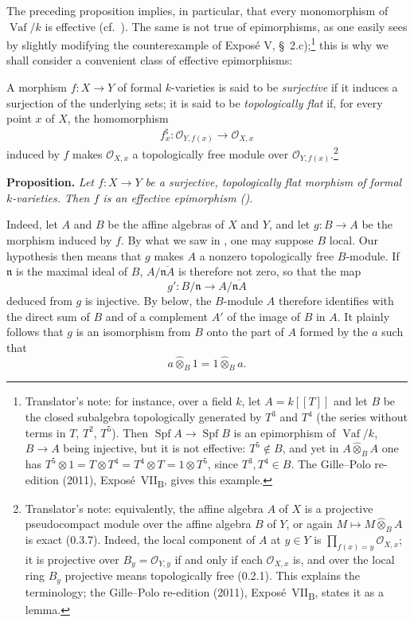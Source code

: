 The preceding proposition implies, in particular, that every
monomorphism of \(\operatorname{Vaf}/k\) is effective
\textup{(cf.\ )}.
The same is not true of epimorphisms, as one easily sees by slightly
modifying the counterexample of Expos\'e V, \S~2.c);\footnote{Translator's note: for instance, over a field
\(k\), let \(A=k[[T]]\) and let \(B\) be the closed subalgebra topologically generated by \(T^3\) and
\(T^4\) (the series without terms in \(T\), \(T^2\), \(T^5\)). Then \(\operatorname{Spf}A\to\operatorname{Spf}B\)
is an epimorphism of \(\operatorname{Vaf}/k\), \(B\to A\) being injective, but it is not effective:
\(T^5\notin B\), and yet in \(A\widehat\otimes_BA\) one has
\(T^5\otimes1=T\otimes T^4=T^4\otimes T=1\otimes T^5\), since \(T^3,T^4\in B\). The Gille--Polo
re-edition (2011), Expos\'e~VII\textsubscript{B}, gives this example.} this is why we shall consider a
convenient class of effective epimorphisms:

A morphism \(f:X\to Y\) of formal \(k\)-varieties is said to be
\emph{surjective} if it induces a surjection of the underlying sets; it
is said to be \emph{topologically flat} if, for every point \(x\) of
\(X\), the homomorphism
\[
  f_x^\natural:
  \mathcal O_{Y,f(x)}
  \longrightarrow
  \mathcal O_{X,x}
\]
induced by \(f\) makes \(\mathcal O_{X,x}\) a topologically free module
over \(\mathcal O_{Y,f(x)}\).\footnote{Translator's note: equivalently, the affine algebra \(A\) of \(X\) is
a projective pseudocompact module over the affine algebra \(B\) of \(Y\), or again
\(M\mapsto M\widehat\otimes_BA\) is exact (0.3.7). Indeed, the local component of \(A\) at \(y\in Y\) is
\(\prod_{f(x)=y}\mathcal O_{X,x}\); it is projective over \(B_y=\mathcal O_{Y,y}\) if and only if each
\(\mathcal O_{X,x}\) is, and over the local ring \(B_y\) projective means topologically free (0.2.1). This
explains the terminology; the Gille--Polo re-edition (2011), Expos\'e~VII\textsubscript{B}, states it as a
lemma.}

\medskip
\noindent\textbf{Proposition.}
\label{sga3:VIIB:1.3.1.effective-epi}
{\itshape Let \(f:X\to Y\) be a surjective, topologically flat
morphism of formal \(k\)-varieties. Then \(f\) is an effective
epimorphism \textup{()}.}

Indeed, let \(A\) and \(B\) be the affine algebras of \(X\) and \(Y\),
and let \(g:B\to A\) be the morphism induced by \(f\). By what we saw in
, one may suppose \(B\) local. Our hypothesis then means that
\(g\) makes \(A\) a nonzero topologically free \(B\)-module. If
\(\mathfrak n\) is the maximal ideal of \(B\),
\(A/\overline{\mathfrak nA}\) is therefore not zero, so that the map
\[
  g':B/\mathfrak n\longrightarrow
     A/\overline{\mathfrak nA}
\]
deduced from \(g\) is injective. By  below, the
\(B\)-module \(A\) therefore identifies with the direct sum of \(B\) and of
a complement \(A'\) of the image of \(B\) in \(A\). It plainly follows
that \(g\) is an isomorphism from \(B\) onto the part of \(A\) formed by
the \(a\) such that
\[
  a\widehat{\otimes}_B1
  =
  1\widehat{\otimes}_B a.
\]

